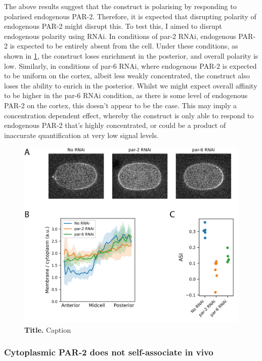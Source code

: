 \documentclass[12pt]{"article"}
\newcommand{\mycaption}[2]{\caption[#1]{\textbf{#1.} #2}}
\begin{document}
The above results suggest that the construct is polarising by responding to polarised endogenous PAR-2. Therefore, it is expected that disrupting polarity of endogenous PAR-2 might disrupt this. To test this, I aimed to disrupt endogenous polarity using RNAi. In conditions of par-2 RNAi, endogenous PAR-2 is expected to be entirely absent from the cell. Under these conditions, as shown in \cref{fig:ph_ring_rnai}, the construct loses enrichment in the posterior, and overall polarity is low. Similarly, in conditions of par-6 RNAi, where endogenous PAR-2 is expected to be uniform on the cortex, albeit less weakly concentrated, the construct also loses the ability to enrich in the posterior. Whilst we might expect overall affinity to be higher in the par-6 RNAi condition, as there is some level of endogenous PAR-2 on the cortex, this doesn’t appear to be the case. This may imply a concentration dependent effect, whereby the construct is only able to respond to endogenous PAR-2 that’s highly concentrated, or could be a product of inaccurate quantification at very low signal levels.\\

\begin{figure}[!h]
\includegraphics[scale=1]{ph_ring_rnai}
\setlength{\abovecaptionskip}{20pt}
\centering
\mycaption{Title}{Caption}
\label{fig:ph_ring_rnai}
\end{figure}


\subsubsection{Cytoplasmic PAR-2  does not self-associate in vivo}
\end{document}
